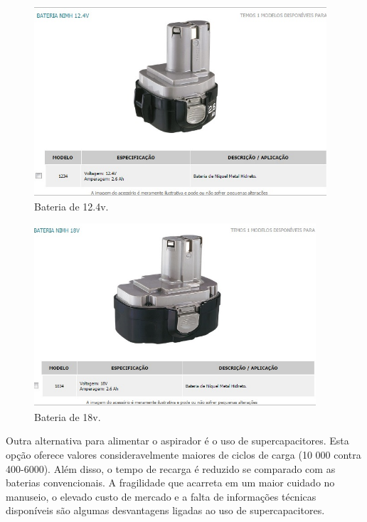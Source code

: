 	\begin{figure}[H]
		\centering
		\includegraphics[scale=0.55]{figuras/bateria_2.png}
		\caption{Bateria de 12.4v.}
		\label{img:bateria_2}
	\end{figure}
	
	\begin{figure}[H]
		\centering
		\includegraphics[scale=0.55]{figuras/bateria_3.png}
		\caption{Bateria de 18v.}
		\label{img:bateria_3}
	\end{figure}

	Outra alternativa para alimentar o aspirador é o uso de supercapacitores. Esta opção oferece valores consideravelmente maiores de ciclos de carga (10 000 contra 400-6000). Além disso, o tempo de recarga é reduzido se comparado com as baterias convencionais. A fragilidade que acarreta em um maior cuidado no manuseio, o elevado custo de mercado e a falta de informações técnicas disponíveis são algumas desvantagens ligadas ao uso de supercapacitores.
